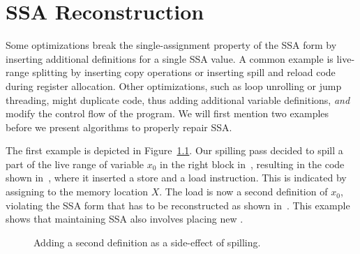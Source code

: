 
\chapter{SSA Reconstruction }
\label{chapter:repair_maintain_ssa_after_optimization}

{
\def\pendphi{pending\_$\phi$\xspace}


Some optimizations break the single-assignment property of the SSA form by inserting additional definitions for a single SSA value.
A common example is live-range splitting by inserting copy operations or inserting spill and reload code during register allocation.
Other optimizations, such as loop unrolling or jump threading, might duplicate code, thus adding additional variable definitions, \emph{and} modify the control flow of the program.
We will first mention two examples before we present algorithms to properly repair SSA.

The first example is depicted in Figure~\ref{fig:ex1}.
Our spilling pass decided to spill a part of the live range of variable $x_0$
in the right block in~, resulting in the code shown
in~,
where it inserted a store and a load instruction.
This is indicated by assigning to the memory location $X$.
The load is now a second definition of $x_0$, violating the SSA form that has
to be reconstructed as shown in~.
This example shows that maintaining SSA also involves placing new \phifuns.

\begin{figure}[htbp]
  {\def\back{\kern1pt}
	\centering
        \back
        \back
      }
	\caption{Adding a second definition as a side-effect of spilling.}
	\label{fig:ex1}
\end{figure}

}
